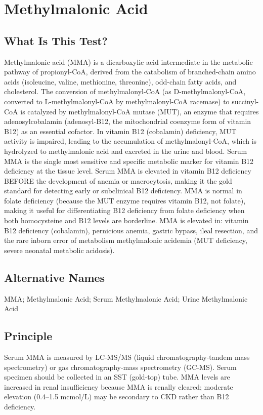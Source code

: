 \chapter{Methylmalonic Acid}
\section*{What Is This Test?}
Methylmalonic acid (MMA) is a dicarboxylic acid intermediate in the metabolic pathway of propionyl-CoA, derived from the catabolism of branched-chain amino acids (isoleucine, valine, methionine, threonine), odd-chain fatty acids, and cholesterol. The conversion of methylmalonyl-CoA (as D-methylmalonyl-CoA, converted to L-methylmalonyl-CoA by methylmalonyl-CoA racemase) to succinyl-CoA is catalyzed by methylmalonyl-CoA mutase (MUT), an enzyme that requires adenosylcobalamin (adenosyl-B12, the mitochondrial coenzyme form of vitamin B12) as an essential cofactor. In vitamin B12 (cobalamin) deficiency, MUT activity is impaired, leading to the accumulation of methylmalonyl-CoA, which is hydrolyzed to methylmalonic acid and excreted in the urine and blood. Serum MMA is the single most sensitive and specific metabolic marker for vitamin B12 deficiency at the tissue level. Serum MMA is elevated in vitamin B12 deficiency BEFORE the development of anemia or macrocytosis, making it the gold standard for detecting early or subclinical B12 deficiency. MMA is normal in folate deficiency (because the MUT enzyme requires vitamin B12, not folate), making it useful for differentiating B12 deficiency from folate deficiency when both homocysteine and B12 levels are borderline. MMA is elevated in: vitamin B12 deficiency (cobalamin), pernicious anemia, gastric bypass, ileal resection, and the rare inborn error of metabolism methylmalonic acidemia (MUT deficiency, severe neonatal metabolic acidosis).
\section*{Alternative Names}
MMA; Methylmalonic Acid; Serum Methylmalonic Acid; Urine Methylmalonic Acid
\section*{Principle}
Serum MMA is measured by LC-MS/MS (liquid chromatography-tandem mass spectrometry) or gas chromatography-mass spectrometry (GC-MS). Serum specimen should be collected in an SST (gold-top) tube. MMA levels are increased in renal insufficiency because MMA is renally cleared; moderate elevation (0.4--1.5 mcmol/L) may be secondary to CKD rather than B12 deficiency.
